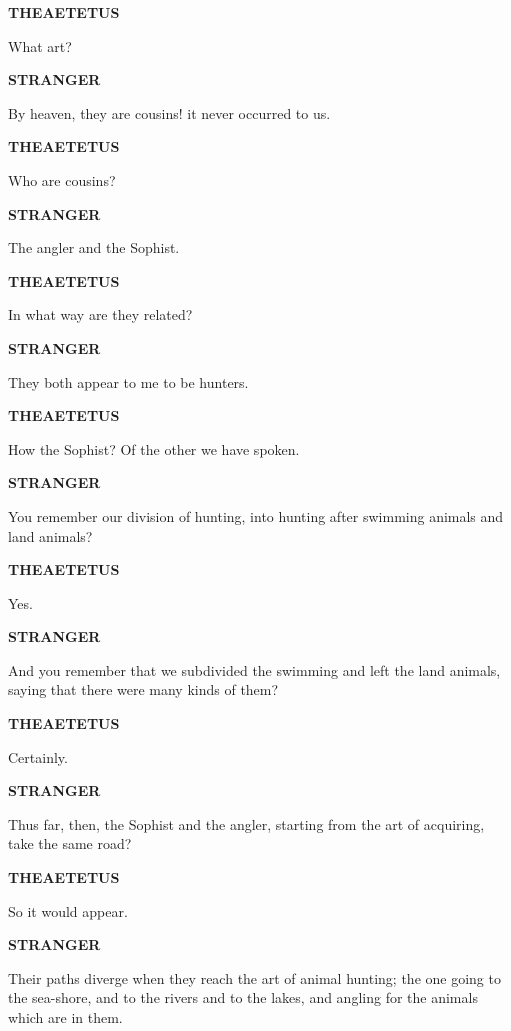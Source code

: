 \documentclass[11pt,letter]{article}
\begin{document}
\par \textbf{THEAETETUS}
\par   What art?

\par \textbf{STRANGER}
\par   By heaven, they are cousins! it never occurred to us.

\par \textbf{THEAETETUS}
\par   Who are cousins?

\par \textbf{STRANGER}
\par   The angler and the Sophist.

\par \textbf{THEAETETUS}
\par   In what way are they related?

\par \textbf{STRANGER}
\par   They both appear to me to be hunters.

\par \textbf{THEAETETUS}
\par   How the Sophist? Of the other we have spoken.

\par \textbf{STRANGER}
\par   You remember our division of hunting, into hunting after swimming animals and land animals?

\par \textbf{THEAETETUS}
\par   Yes.

\par \textbf{STRANGER}
\par   And you remember that we subdivided the swimming and left the land animals, saying that there were many kinds of them?

\par \textbf{THEAETETUS}
\par   Certainly.

\par \textbf{STRANGER}
\par   Thus far, then, the Sophist and the angler, starting from the art of acquiring, take the same road?

\par \textbf{THEAETETUS}
\par   So it would appear.

\par \textbf{STRANGER}
\par   Their paths diverge when they reach the art of animal hunting; the one going to the sea-shore, and to the rivers and to the lakes, and angling for the animals which are in them.
\end{document}
